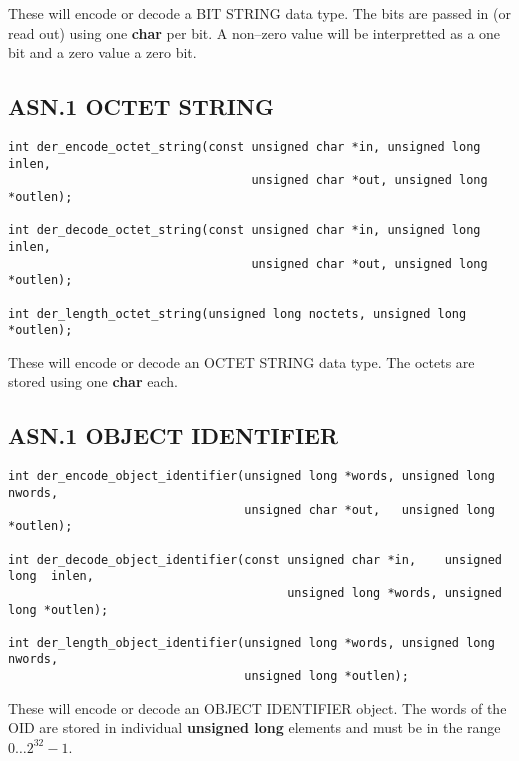 \documentclass[a4paper]{book}
\begin{document}
These will encode or decode a BIT STRING data type.  The bits are passed in (or read out) using one \textbf{char} per bit.  A non--zero value will be interpretted
as a one bit and a zero value a zero bit.

\subsection{ASN.1 OCTET STRING}

\begin{verbatim}
int der_encode_octet_string(const unsigned char *in, unsigned long inlen,
                                  unsigned char *out, unsigned long *outlen);

int der_decode_octet_string(const unsigned char *in, unsigned long inlen,
                                  unsigned char *out, unsigned long *outlen);

int der_length_octet_string(unsigned long noctets, unsigned long *outlen);
\end{verbatim}

These will encode or decode an OCTET STRING data type.  The octets are stored using one \textbf{char} each.  

\subsection{ASN.1 OBJECT IDENTIFIER}

\begin{verbatim}
int der_encode_object_identifier(unsigned long *words, unsigned long  nwords,
                                 unsigned char *out,   unsigned long *outlen);

int der_decode_object_identifier(const unsigned char *in,    unsigned long  inlen,
                                       unsigned long *words, unsigned long *outlen);

int der_length_object_identifier(unsigned long *words, unsigned long nwords, 
                                 unsigned long *outlen);
\end{verbatim}

These will encode or decode an OBJECT IDENTIFIER object.  The words of the OID are stored in individual \textbf{unsigned long} elements and must be in the range
$0 \ldots 2^{32} - 1$.  
\end{document}
